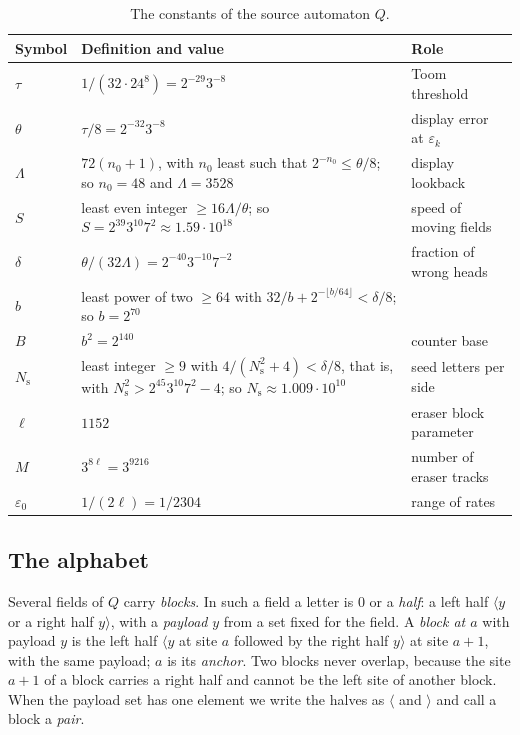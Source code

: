 \documentclass[11pt]{article}
\theoremstyle{plain}
\theoremstyle{definition}
\theoremstyle{remark}
\newcommand{\eps}{\varepsilon}
\newcommand{\Lh}[1]{\langle #1}
\newcommand{\Rh}[1]{#1\rangle}
\begin{document}
\begin{table}[ht]
\centering\small
\begin{tabularx}{\textwidth}{@{}l >{\raggedright\arraybackslash}X >{\raggedright\arraybackslash}p{}@{}}
\toprule
Symbol & Definition and value & Role\\
\midrule
$\tau$ & $1/(32\cdot24^8)=2^{-29}3^{-8}$ & Toom threshold\\
$\theta$ & $\tau/8=2^{-32}3^{-8}$ & display error at $\eps_k$\\
$\Lambda$ & $72(n_0+1)$, with $n_0$ least such that $2^{-n_0}\le\theta/8$; so $n_0=48$ and $\Lambda=3528$ & display lookback\\
$S$ & least even integer $\ge16\Lambda/\theta$; so $S=2^{39}3^{10}7^2\approx1.59\cdot10^{18}$ & speed of moving fields\\
$\delta$ & $\theta/(32\Lambda)=2^{-40}3^{-10}7^{-2}$ & fraction of wrong heads\\
$b$ & least power of two $\ge64$ with $32/b+2^{-\lfloor b/64\rfloor}<\delta/8$; so $b=2^{70}$ & \\
$B$ & $b^2=2^{140}$ & counter base\\
$N_{\mathrm s}$ & least integer $\ge9$ with $4/(N_{\mathrm s}^2+4)<\delta/8$, that is, with $N_{\mathrm s}^2>2^{45}3^{10}7^2-4$; so $N_{\mathrm s}\approx1.009\cdot10^{10}$ & seed letters per side\\
$\ell$ & $1152$ & eraser block parameter\\
$M$ & $3^{8\ell}=3^{9216}$ & number of eraser tracks\\
$\eps_0$ & $1/(2\ell)=1/2304$ & range of rates\\
\bottomrule
\end{tabularx}
\caption{The constants of the source automaton $Q$.}
\label{tab:constants}
\end{table}

\subsection{The alphabet}

Several fields of $Q$ carry \emph{blocks}. In such a field a letter is $0$ or a \emph{half}: a left half $\Lh y$ or a right half $\Rh y$, with a \emph{payload} $y$ from a set fixed for the field. A \emph{block at $a$} with payload $y$ is the left half $\Lh y$ at site $a$ followed by the right half $\Rh y$ at site $a+1$, with the same payload; $a$ is its \emph{anchor}. Two blocks never overlap, because the site $a+1$ of a block carries a right half and cannot be the left site of another block. When the payload set has one element we write the halves as $\langle$ and $\rangle$ and call a block a \emph{pair}.
\end{document}
